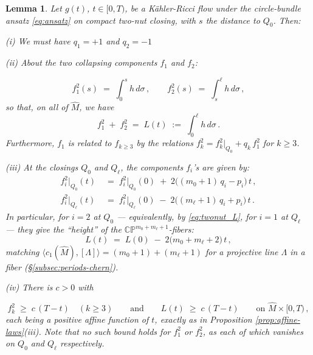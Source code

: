 \documentclass[11pt]{amsart}
\theoremstyle{plain}
\numberwithin{equation}{section}
\newtheorem{lemma}[theorem]{Lemma}
\theoremstyle{definition}
\theoremstyle{remark}
\begin{document}
\begin{lemma}\label{lem:twonut}
Let $g (t)$, $t \in [ 0, T )$, be a K\"ahler-Ricci flow under the circle-bundle ansatz \eqref{eq:ansatz} on compact two-nut closing, with $s$ the distance to $Q_0$. Then:

\noindent (i) We must have $q_1 = + 1$ and $q_2 = - 1$

\noindent (ii) About the two collapsing components $f_1$ and $f_2$:

\[
f_1^2 ( s ) \;=\; \int_0^s h\, d\sigma \,, \qquad f_2^2 ( s ) \;=\; \int_s^\ell h\, d\sigma \,,
\]
so that, on all of $\widehat{M}$, we have
\begin{equation}\label{eq:twonut_L}
f_1^2 \;+\; f_2^2 \;=\; L (t) \;:=\; \int_0^\ell h\, d\sigma \,.
\end{equation}
Furthermore, $f_1$ is related to $f_{k \geq 3}$ by the relations $f_k^2 = f_k^2 \big|_{Q_0} + q_k\, f_1^2$ for $k \geq 3$.

\noindent (iii) At the closings $Q_0$ and $Q_\ell$, the components $f_i$'s are given by:
\begin{align*}
f_i^2 \big|_{Q_0} (t) & \;=\; f_i^2 \big|_{Q_0} (0) \;+\; 2 \big( ( m_0 + 1 )\, q_i - p_i \big)\, t \,,\\
 f_i^2 \big|_{Q_\ell} (t) & \;=\; f_i^2 \big|_{Q_\ell} (0) \;-\; 2 \big( ( m_\ell + 1 )\, q_i + p_i \big)\, t \,.
\end{align*}
In particular, for $i = 2$ at $Q_0$ --- equivalently, by \eqref{eq:twonut_L}, for $i = 1$ at $Q_\ell$ --- they give the ``height'' of the $\mathbb{CP}^{m_0 + m_\ell +1}$-fibers:
\begin{equation}\label{eq:twonut_Lrate}
L (t) \;=\; L (0) \;-\; 2 \big( m_0 + m_\ell + 2 \big)\, t \,,
\end{equation}
matching $\big\langle c_1 ( \widehat{M} ), [ \Lambda ] \big\rangle = ( m_0 + 1 ) + ( m_\ell + 1 )$ for a projective line $\Lambda$ in a fiber (\S\ref{subsec:periods-chern}).

\noindent (iv) There is $c > 0$ with

\[
f_k^2 \;\geq\; c\, ( T - t ) \quad ( k \geq 3 ) \qquad \text{and} \qquad L (t) \;\geq\; c\, ( T - t ) \qquad \text{on } \widehat{M} \times [ 0, T ) \,,
\]
each being a positive affine function of $t$, exactly as in Proposition \ref{prop:affine-laws}(iii). Note that no such bound holds for $f_1^2$ or $f_2^2$, as each of which vanishes on $Q_0$ and $Q_\ell$ respectively.

\end{lemma}
\end{document}
